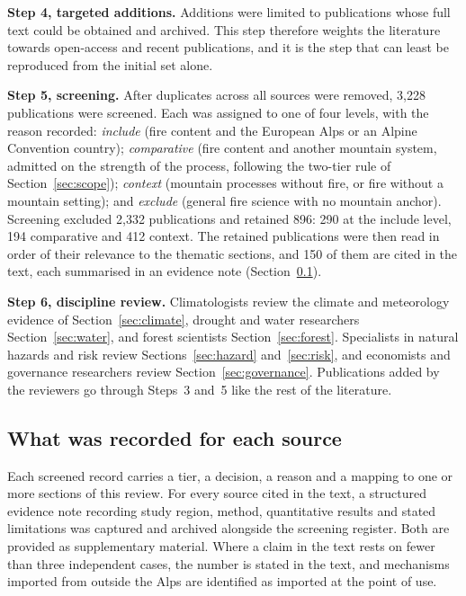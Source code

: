 \documentclass[11pt,a4paper]{article}
\begin{document}
\textbf{Step 4, targeted additions.} Additions were limited to publications whose full text could be obtained and archived. This step therefore weights the literature towards open-access and recent publications, and it is the step that can least be reproduced from the initial set alone.

\textbf{Step 5, screening.} After duplicates across all sources were removed, 3{,}228 publications were screened. Each was assigned to one of four levels, with the reason recorded: \emph{include} (fire content and the European Alps or an Alpine Convention country); \emph{comparative} (fire content and another mountain system, admitted on the strength of the process, following the two-tier rule of Section~\ref{sec:scope}); \emph{context} (mountain processes without fire, or fire without a mountain setting); and \emph{exclude} (general fire science with no mountain anchor). Screening excluded 2{,}332 publications and retained 896: 290 at the include level, 194 comparative and 412 context. The retained publications were then read in order of their relevance to the thematic sections, and 150 of them are cited in the text, each summarised in an evidence note (Section~\ref{app:recorded}).

\textbf{Step 6, discipline review.} Climatologists review the climate and meteorology evidence of Section~\ref{sec:climate}, drought and water researchers Section~\ref{sec:water}, and forest scientists Section~\ref{sec:forest}. Specialists in natural hazards and risk review Sections~\ref{sec:hazard} and~\ref{sec:risk}, and economists and governance researchers review Section~\ref{sec:governance}. Publications added by the reviewers go through Steps~3 and~5 like the rest of the literature.

\subsection{What was recorded for each source}
\label{app:recorded}

Each screened record carries a tier, a decision, a reason and a mapping to one or more sections of this review. For every source cited in the text, a structured evidence note recording study region, method, quantitative results and stated limitations was captured and archived alongside the screening register. Both are provided as supplementary material. Where a claim in the text rests on fewer than three independent cases, the number is stated in the text, and mechanisms imported from outside the Alps are identified as imported at the point of use.
\end{document}
